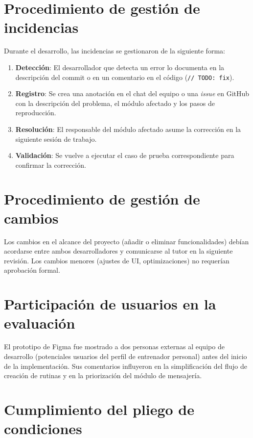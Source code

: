 \section{Procedimiento de gestión de incidencias}

Durante el desarrollo, las incidencias se gestionaron de la siguiente forma:

\begin{enumerate}
  \item \textbf{Detección}: El desarrollador que detecta un error lo documenta en la descripción del commit o en un comentario en el código (\texttt{// TODO: fix}).
  \item \textbf{Registro}: Se crea una anotación en el chat del equipo o una \textit{issue} en GitHub con la descripción del problema, el módulo afectado y los pasos de reproducción.
  \item \textbf{Resolución}: El responsable del módulo afectado asume la corrección en la siguiente sesión de trabajo.
  \item \textbf{Validación}: Se vuelve a ejecutar el caso de prueba correspondiente para confirmar la corrección.
\end{enumerate}

\section{Procedimiento de gestión de cambios}

Los cambios en el alcance del proyecto (añadir o eliminar funcionalidades) debían acordarse entre ambos desarrolladores y comunicarse al tutor en la siguiente revisión. Los cambios menores (ajustes de UI, optimizaciones) no requerían aprobación formal.

\section{Participación de usuarios en la evaluación}

El prototipo de Figma fue mostrado a dos personas externas al equipo de desarrollo (potenciales usuarios del perfil de entrenador personal) antes del inicio de la implementación. Sus comentarios influyeron en la simplificación del flujo de creación de rutinas y en la priorización del módulo de mensajería.

\section{Cumplimiento del pliego de condiciones}

